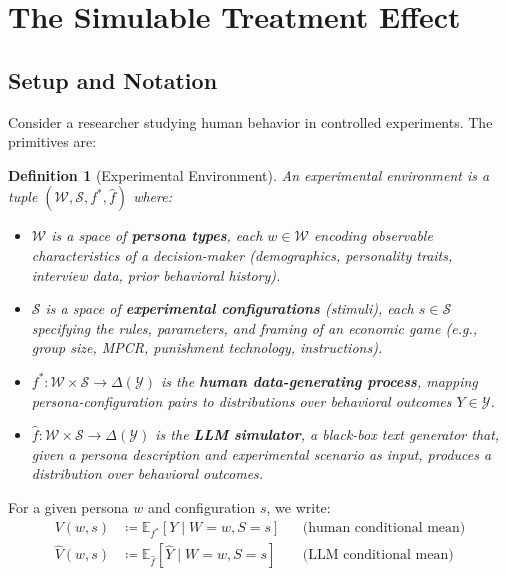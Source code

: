 \documentclass[12pt]{article}
\newtheorem{definition}{Definition}
\newcommand{\E}{\mathbb{E}}
\newcommand{\fhat}{\hat{f}}
\begin{document}
\section{The Simulable Treatment Effect}
\label{sec:formal}

\subsection{Setup and Notation}

Consider a researcher studying human behavior in controlled experiments. The primitives are:

\begin{definition}[Experimental Environment]
An experimental environment is a tuple $(\mathcal{W}, \mathcal{S}, f^*, \fhat)$ where:
\begin{itemize}
  \item $\mathcal{W}$ is a space of \textbf{persona types}, each $w \in \mathcal{W}$ encoding observable characteristics of a decision-maker (demographics, personality traits, interview data, prior behavioral history).
  \item $\mathcal{S}$ is a space of \textbf{experimental configurations} (stimuli), each $s \in \mathcal{S}$ specifying the rules, parameters, and framing of an economic game (e.g., group size, MPCR, punishment technology, instructions).
  \item $f^*: \mathcal{W} \times \mathcal{S} \to \Delta(\mathcal{Y})$ is the \textbf{human data-generating process}, mapping persona-configuration pairs to distributions over behavioral outcomes $Y \in \mathcal{Y}$.
  \item $\fhat: \mathcal{W} \times \mathcal{S} \to \Delta(\mathcal{Y})$ is the \textbf{LLM simulator}, a black-box text generator that, given a persona description and experimental scenario as input, produces a distribution over behavioral outcomes.
\end{itemize}
\end{definition}

For a given persona $w$ and configuration $s$, we write:
\begin{align}
  V(w, s)   &\coloneqq \E_{f^*}[Y \mid W = w, S = s]   && \text{(human conditional mean)} \\
  \hat{V}(w, s) &\coloneqq \E_{\fhat}[\hat{Y} \mid W = w, S = s]  && \text{(LLM conditional mean)}
\end{align}
\end{document}
